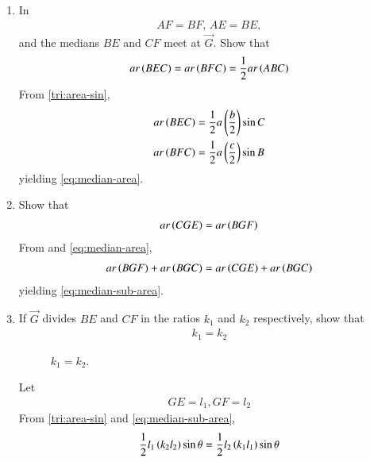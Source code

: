\begin{enumerate}[label=\thesection.\arabic*.,ref=\thesection.\theenumi]
  \item In 
	\begin{align}
	AF = BF, \,
	AE = BE, 
	\end{align}
	and the medians $BE$ and $CF$ meet at $\vec{G}$.
	Show that
\begin{align}
	ar\left(BEC\right)
	=ar\left(BFC\right) = \frac{1}{2}ar\left(ABC\right)
	\label{eq:median-area}
\end{align}
\solution
	From \eqref{tri:area-sin},
\begin{align}
	ar\left(BEC\right) &= 
	\frac{1}{2}a\left(\frac{b}{2}\right)\sin C 
	\\
	ar\left(BFC\right)&=
	\frac{1}{2}a\left(\frac{c}{2}\right)\sin  B
\end{align}
yielding
	\eqref{eq:median-area}.
\item 
	Show that
\begin{align}
	ar\left(CGE\right)
	=ar\left(BGF\right) 
	\label{eq:median-sub-area}
\end{align}
\solution 
From 
	and 
	\eqref{eq:median-area},
\begin{align}
	ar\left(BGF\right)
	+
	ar\left(BGC\right)
	=
	ar\left(CGE\right)
	+
	ar\left(BGC\right)
\end{align}
yielding 
	\eqref{eq:median-sub-area}.
\item 
	If $\vec{G}$ divides $BE$ and $CF$ in the ratios $k_1$ and $k_2$ respectively, 
	show that
	\begin{align}
\label{eq:tri_med_centroid_ratio}
k_1 = k_2 
	\end{align}
%
\begin{figure}[!ht]
	\begin{center}
		\resizebox{\columnwidth}{!}{}
	\end{center}
	\caption{$k_1=k_2$.}
	\label{fig:tri_med_isect}	
\end{figure}
\solution 
Let 
\begin{align}
	GE = l_1, GF = l_2
\end{align}
From 
	\eqref{tri:area-sin}
	and 
	\eqref{eq:median-sub-area},
\begin{align}
	\frac{1}{2}l_1 \left(k_2l_2\right) \sin \theta
	= \frac{1}{2}l_2 \left(k_1l_1\right)\sin \theta
\end{align}

\end{enumerate}
